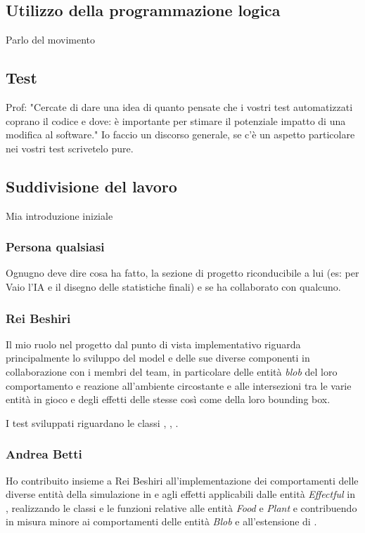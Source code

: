 \subsection{Utilizzo della programmazione logica}
Parlo del movimento

\subsection{Test}
Prof: "Cercate di dare una idea di quanto pensate che i vostri test automatizzati coprano il codice e dove: è importante per stimare il potenziale impatto di una modifica al software." 
Io faccio un discorso generale, se c'è un aspetto particolare nei vostri test scrivetelo pure.



\subsection{Suddivisione del lavoro}
Mia introduzione iniziale

\subsubsection{Persona qualsiasi}
Ognugno deve dire cosa ha fatto, la sezione di progetto riconducibile a lui (es: per Vaio l'IA e il disegno delle statistiche finali) e se ha collaborato con qualcuno.

\subsubsection{Rei Beshiri}
Il mio ruolo nel progetto dal punto di vista implementativo riguarda principalmente lo sviluppo del model e delle sue diverse componenti in collaborazione con i membri del team, in particolare delle entità \textit{blob} del loro comportamento e reazione all'ambiente circostante e alle intersezioni tra le varie entità in gioco e degli effetti delle stesse così come della loro bounding box.

I test sviluppati riguardano le classi , , .

\subsubsection{Andrea Betti}
Ho contribuito insieme a Rei Beshiri all'implementazione dei comportamenti delle diverse entità della simulazione in  e agli effetti applicabili dalle entità \textit{Effectful} in , realizzando le classi e le funzioni relative alle entità \textit{Food} e \textit{Plant} e contribuendo in misura minore ai comportamenti delle entità \textit{Blob} e all'estensione di .

